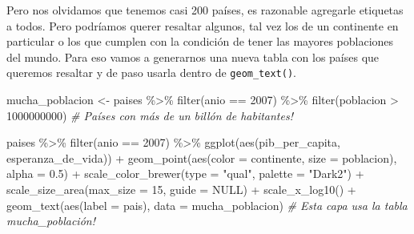 \documentclass[
  openany]{book}
\newenvironment{Shaded}{\begin{snugshade}}{\end{snugshade}}
\newcommand{\AttributeTok}[1]{\textcolor[rgb]{0.77,0.63,0.00}{#1}}
\newcommand{\CommentTok}[1]{\textcolor[rgb]{0.56,0.35,0.01}{\textit{#1}}}
\newcommand{\ConstantTok}[1]{\textcolor[rgb]{0.00,0.00,0.00}{#1}}
\newcommand{\DecValTok}[1]{\textcolor[rgb]{0.00,0.00,0.81}{#1}}
\newcommand{\FloatTok}[1]{\textcolor[rgb]{0.00,0.00,0.81}{#1}}
\newcommand{\FunctionTok}[1]{\textcolor[rgb]{0.00,0.00,0.00}{#1}}
\newcommand{\NormalTok}[1]{#1}
\newcommand{\OtherTok}[1]{\textcolor[rgb]{0.56,0.35,0.01}{#1}}
\newcommand{\SpecialCharTok}[1]{\textcolor[rgb]{0.00,0.00,0.00}{#1}}
\newcommand{\StringTok}[1]{\textcolor[rgb]{0.31,0.60,0.02}{#1}}
\begin{document}
Pero nos olvidamos que tenemos casi 200 países, es razonable agregarle etiquetas a todos.
Pero podríamos querer resaltar algunos, tal vez los de un continente en particular o los que cumplen con la condición de tener las mayores poblaciones del mundo.
Para eso vamos a generarnos una nueva tabla con los países que queremos resaltar y de paso usarla dentro de \texttt{geom\_text()}.

\begin{Shaded}
\begin{Highlighting}[]
\NormalTok{mucha\_poblacion }\OtherTok{\textless{}{-}}\NormalTok{ paises }\SpecialCharTok{\%\textgreater{}\%} 
  \FunctionTok{filter}\NormalTok{(anio }\SpecialCharTok{==} \DecValTok{2007}\NormalTok{) }\SpecialCharTok{\%\textgreater{}\%} 
  \FunctionTok{filter}\NormalTok{(poblacion }\SpecialCharTok{\textgreater{}} \DecValTok{1000000000}\NormalTok{) }\CommentTok{\# Países con más de un billón de habitantes!}

\NormalTok{paises }\SpecialCharTok{\%\textgreater{}\%} 
  \FunctionTok{filter}\NormalTok{(anio }\SpecialCharTok{==} \DecValTok{2007}\NormalTok{) }\SpecialCharTok{\%\textgreater{}\%} 
  \FunctionTok{ggplot}\NormalTok{(}\FunctionTok{aes}\NormalTok{(pib\_per\_capita, esperanza\_de\_vida)) }\SpecialCharTok{+}
  \FunctionTok{geom\_point}\NormalTok{(}\FunctionTok{aes}\NormalTok{(}\AttributeTok{color =}\NormalTok{ continente, }\AttributeTok{size =}\NormalTok{ poblacion), }\AttributeTok{alpha =} \FloatTok{0.5}\NormalTok{) }\SpecialCharTok{+}
  \FunctionTok{scale\_color\_brewer}\NormalTok{(}\AttributeTok{type =} \StringTok{"qual"}\NormalTok{, }\AttributeTok{palette =} \StringTok{"Dark2"}\NormalTok{) }\SpecialCharTok{+}
  \FunctionTok{scale\_size\_area}\NormalTok{(}\AttributeTok{max\_size =} \DecValTok{15}\NormalTok{, }\AttributeTok{guide =} \ConstantTok{NULL}\NormalTok{) }\SpecialCharTok{+}
  \FunctionTok{scale\_x\_log10}\NormalTok{() }\SpecialCharTok{+}
  \FunctionTok{geom\_text}\NormalTok{(}\FunctionTok{aes}\NormalTok{(}\AttributeTok{label =}\NormalTok{ pais), }
            \AttributeTok{data =}\NormalTok{ mucha\_poblacion)  }\CommentTok{\# Esta capa usa la tabla mucha\_población!}
\end{Highlighting}
\end{Shaded}
\end{document}
